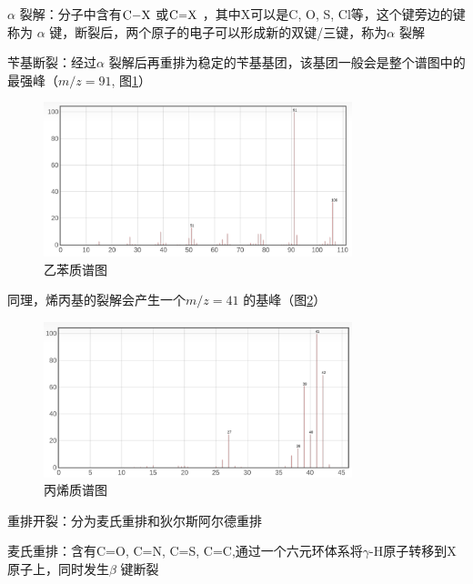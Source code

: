 \begin{notation}
    $\alpha$ 裂解：分子中含有$\ce{C-X}$ 或$\ce{C=X}$ ，其中X可以是C, O, S, Cl等，这个键旁边的键称为 $\alpha$ 键，断裂后，两个原子的电子可以形成新的双键/三键，称为$\alpha$ 裂解

    苄基断裂：经过$\alpha$ 裂解后再重排为稳定的苄基基团，该基团一般会是整个谱图中的最强峰（$m / z = 91$, 图\ref{fig:-figures-乙苯质谱图-png}）
    \begin{figure}[htpb]
        \centering
        \includegraphics[width=0.8\textwidth]{./figures/乙苯质谱图.png}
        \caption{乙苯质谱图}
        \label{fig:-figures-乙苯质谱图-png}
    \end{figure}
    
    同理，烯丙基的裂解会产生一个$m / z = 41$ 的基峰（图\ref{fig:-figures-丙烯质谱图}）
    \begin{figure}[htpb]
        \centering
        \includegraphics[width=0.8\textwidth]{./figures/丙烯质谱图}
        \caption{丙烯质谱图}
        \label{fig:-figures-丙烯质谱图}
    \end{figure}
\end{notation}
\begin{notation}
    重排开裂：分为麦氏重排和狄尔斯阿尔德重排

    麦氏重排：含有C=O, C=N, C=S, C=C,通过一个六元环体系将$\gamma$-H原子转移到X原子上，同时发生$\beta$ 键断裂
\end{notation}
